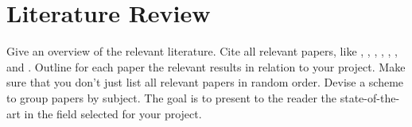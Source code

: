 \documentclass[11pt]{article}       %
\begin{document}
\section{Literature Review} \label{litrev}





Give an overview of the relevant literature. Cite all relevant
papers, like \cite{DEL07}, \cite{PD07}, \cite{DER07}, \cite{LDR07},
\cite{DLX06}, \cite{CDE06}, and \cite{DFL06}. Outline for each paper
the relevant results in relation to your project. Make sure that you
don't just list all relevant papers in random order. Devise a scheme
to group papers by subject. The goal is to present to the reader the
state-of-the-art in the field selected for your project.




\end{document}
